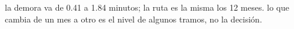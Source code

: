{la demora va de 0.41 a 1.84 minutos; la ruta es la misma los 12 meses.}
{lo que cambia de un mes a otro es el nivel de algunos tramos, no la decisión.}
